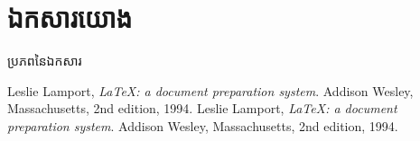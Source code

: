 \documentclass{beamer}
\begin{document}
	\section{ឯកសារយោង}
	\begin{frame}{ប្រភពនៃឯកសារ}
		\begin{thebibliography}{4}
			Leslie Lamport,
			\emph{\LaTeX: a document preparation system}.
			Addison Wesley, Massachusetts,
			2nd edition,
			1994.
			Leslie Lamport,
			\emph{\LaTeX: a document preparation system}.
			Addison Wesley, Massachusetts,
			2nd edition,
			1994.
		\end{thebibliography}
	\end{frame}
\end{document}
